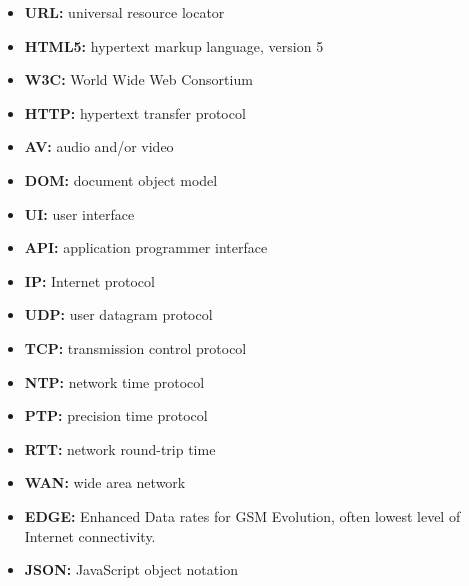 \begin{itemize}
\item{\textbf{URL:} universal resource locator}
\item{\textbf{HTML5:} hypertext markup language, version 5}
\item{\textbf{W3C:} World Wide Web Consortium}
\item{\textbf{HTTP:} hypertext transfer protocol}
\item{\textbf{AV:} audio and/or video}
\item{\textbf{DOM:} document object model}
\item{\textbf{UI:} user interface}
\item{\textbf{API:} application programmer interface}
\item{\textbf{IP:} Internet protocol}
\item{\textbf{UDP:} user datagram protocol}
\item{\textbf{TCP:} transmission control protocol}
\item{\textbf{NTP:} network time protocol}
\item{\textbf{PTP:} precision time protocol}
\item{\textbf{RTT:} network round-trip time}
\item{\textbf{WAN:} wide area network}
\item{\textbf{EDGE:} Enhanced Data rates for GSM Evolution, often lowest level of Internet connectivity.}
\item{\textbf{JSON:} JavaScript object notation}
\end{itemize}
